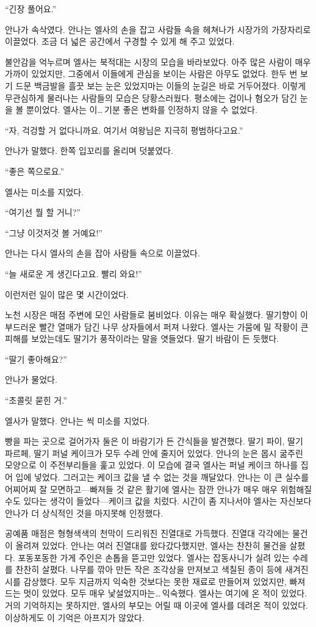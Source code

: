 ``긴장 풀어요.''

안나가 속삭였다. 안나는 엘사의 손을 잡고 사람들 속을 헤쳐나가 시장가의 가장자리로 이끌었다. 조금 더 넓은 공간에서 구경할 수 있게 해 주고 있었다.

불안감을 억누르며 엘사는 북적대는 시장의 모습을 바라보았다. 아주 많은 사람이 매우 가까이 있었지만, 그중에서 이들에게 관심을 보이는 사람은 아무도 없었다. 한두 번 보기 드문 백금발을 흘끗 보는 눈은 있었지마는 이들의 눈길은 바로 거두어졌다. 이렇게 무관심하게 물러나는 사람들의 모습은 당황스러웠다. 평소에는 겁이나 혐오가 담긴 눈을 볼 뿐이었다. 엘사는 이\ldots\,기분 좋은 변화를 인정하지 않을 수 없었다.

``자, 걱겅할 거 없다니까요. 여기서 여왕님은 지극히 평범하다고요.''

안나가 말했다. 한쪽 입꼬리를 올리며 덧붙였다.

``좋은 쪽으로요.''

엘사는 미소를 지었다.

``여기선 뭘 할 거니?''

``그냥 이것저것 볼 거예요!''

안나는 다시 엘사의 손을 잡아 사람들 속으로 이끌었다.

``늘 새로운 게 생긴다고요. 빨리 와요!''

이런저런 일이 많은 몇 시간이었다.

노천 시장은 매점 주변에 모인 사람들로 붐비었다. 이유는 매우 확실했다. 딸기향이 이 부드러운 빨간 열매가 담긴 나무 상자들에서 퍼져 나왔다. 엘사는 가뭄에 밀 작황이 큰 피해를 보았는데도 딸기가 풍작이라는 말을 엿들었다. 딸기 바람이 든 듯했다.

``딸기 좋아해요?''

안나가 물었다.

``초콜릿 묻힌 거.''

엘사가 말했다. 안나는 씩 미소를 지었다.

빵을 파는 곳으로 걸어가자 둘은 이 바람기가 든 간식들을 발견했다. 딸기 파이, 딸기 파르페, 딸기 퍼널 케이크가 모두 수레 안에 줄지어 있었다. 안나의 눈은 몹시 굶주린 모양으로 이 주전부리들을 훑고 있었다. 이 모습에 결국 엘사는 퍼널 케이크 하나를 집어 입에 넣었다. 그러고는 케이크 값을 낼 수 없는 것을 깨달았다. 안나는 이 큰 실수를 어찌어찌 잘 모면하고—빠져들 것 같은 활기에 엘사는 잠깐 안나가 매우 매우 위험해질 수도 있다는 생각이 들었다—케이크 값을 치렀다. 시간이 좀 지나서야 엘사는 자신보다 안나가 더 상식적인 것을 마지못해 인정했다.

공예품 매점은 형형색색의 천막이 드리워진 진열대로 가득했다. 진열대 각각에는 물건이 올려져 있었다. 안나는 여러 진열대를 왔다갔다했지만, 엘사는 찬찬히 물건을 살폈다. 포동포동한 가게 주인은 손톱을 뜯고만 있었다. 엘사는 잡동사니가 실려 있는 수레를 찬찬히 살폈다. 나무를 깎아 만든 작은 조각상을 만져보고 색칠된 종이 등에 새겨진 시를 감상했다. 모두 지금까지 익숙한 것보다는 못한 재료로 만들어져 있었지만, 빠져드는 멋이 있었다. 모두 매우 낯설었지마는\ldots\,익숙했다. 엘사는 여기에 온 적이 있었다. 거의 기억하지는 못하지만, 엘사의 부모는 어릴 때 이곳에 엘사를 데려온 적이 있었다. 이상하게도 이 기억은 아프지가 않았다.

